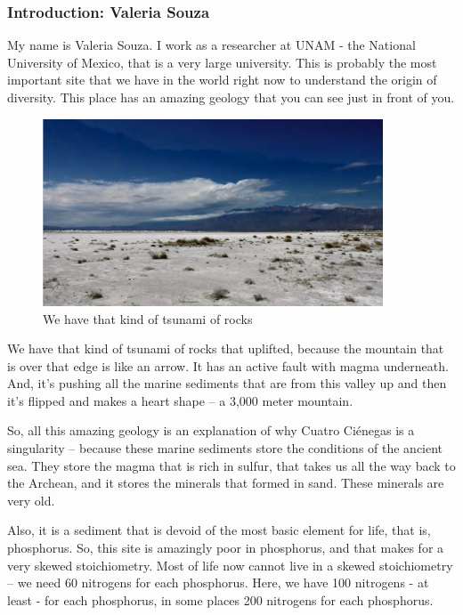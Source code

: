 \documentclass[]{article}
\begin{document}
\subsubsection{Introduction: Valeria Souza}

My name is Valeria Souza. I work as a researcher at UNAM - the National University of Mexico, that is a very large university. This is probably the most important site
that we have in the world right now to understand the origin of diversity. This place has an amazing geology that you can see just in front of you.\cite{souza2018lost}

\begin{figure}[H]
	\caption{We have that kind of tsunami of rocks} 
	\includegraphics[width=0.9\textwidth]{CuatroCienegas2}
\end{figure}

We have that kind of tsunami of rocks that uplifted, because the mountain
that is over that edge is like an arrow. It has an active fault
with magma underneath. And, it's pushing all the marine sediments that are from this valley up and then it's flipped and makes a heart shape -- a 3,000 meter mountain.

So, all this amazing geology is an explanation of why Cuatro  Ci\'enegas is a singularity -- because these marine sediments store the conditions of the ancient sea. They store the magma that is rich in sulfur, that takes us all the way back to the Archean, and it stores the minerals that formed in sand. These minerals are very old.

Also, it is a sediment that is devoid of the most basic element for life, that is, phosphorus. So, this site is amazingly poor in phosphorus, and that makes for a very
skewed stoichiometry. Most of life now cannot live in a skewed stoichiometry -- we need 60 nitrogens for each phosphorus. Here, we have 100 nitrogens - at least - for each phosphorus, in some places 200 nitrogens for each phosphorus.
\end{document}
